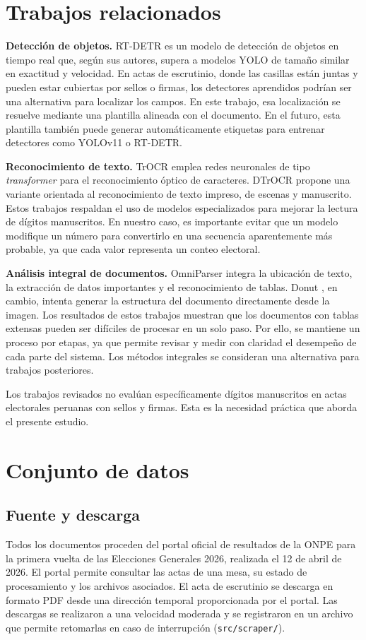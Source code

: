 \documentclass[conference]{IEEEtran}
\begin{document}
\section{Trabajos relacionados}
\textbf{Detecci\'on de objetos.} RT-DETR \cite{rtdetr} es un modelo de detecci\'on
de objetos en tiempo real que, seg\'un sus autores, supera a modelos YOLO de
tama\~no similar en exactitud y velocidad. En actas de escrutinio, donde las
casillas est\'an juntas y pueden estar cubiertas por sellos o firmas, los
detectores aprendidos podr\'ian ser una alternativa para localizar los campos.
En este trabajo, esa localizaci\'on se resuelve mediante una plantilla alineada
con el documento. En el futuro, esta plantilla tambi\'en puede generar
autom\'aticamente etiquetas para entrenar detectores como YOLOv11 o RT-DETR.

\textbf{Reconocimiento de texto.} TrOCR \cite{trocr} emplea redes neuronales
de tipo \emph{transformer} para el reconocimiento \'optico de caracteres.
DTrOCR \cite{dtrocr} propone una variante orientada al reconocimiento de texto
impreso, de escenas y manuscrito. Estos trabajos respaldan el uso de modelos
especializados para mejorar la lectura de d\'igitos manuscritos. En nuestro
caso, es importante evitar que un modelo modifique un n\'umero para convertirlo
en una secuencia aparentemente m\'as probable, ya que cada valor representa un
conteo electoral.

\textbf{An\'alisis integral de documentos.} OmniParser \cite{omniparser}
integra la ubicaci\'on de texto, la extracci\'on de datos importantes y el
reconocimiento de tablas. Donut \cite{donut}, en cambio, intenta generar la
estructura del documento directamente desde la imagen. Los resultados de estos
trabajos muestran que los documentos con tablas extensas pueden ser dif\'iciles
de procesar en un solo paso. Por ello, se mantiene un proceso por etapas, ya
que permite revisar y medir con claridad el desempe\~no de cada parte del
sistema. Los m\'etodos integrales se consideran una alternativa para trabajos
posteriores.

Los trabajos revisados no eval\'uan espec\'ificamente d\'igitos manuscritos en
actas electorales peruanas con sellos y firmas. Esta es la necesidad pr\'actica
que aborda el presente estudio.

\section{Conjunto de datos}
\subsection{Fuente y descarga}
Todos los documentos proceden del portal oficial de resultados de la ONPE para
la primera vuelta de las Elecciones Generales 2026, realizada el 12 de abril de
2026. El portal permite consultar las actas de una mesa, su estado de
procesamiento y los archivos asociados. El acta de escrutinio se descarga en
formato PDF desde una direcci\'on temporal proporcionada por el portal. Las
descargas se realizaron a una velocidad moderada y se registraron en un archivo
que permite retomarlas en caso de interrupci\'on (\texttt{src/scraper/}).
\end{document}
